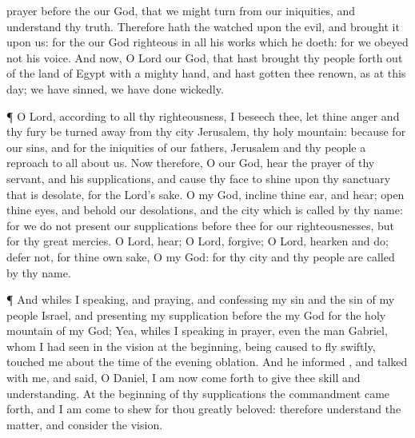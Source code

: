 {prayer
before the
{} our
God, that we might
turn from our
iniquities, and
understand thy
truth.
Therefore hath the
{}
watched upon the
evil, and
brought it upon us: for the
{} our
God
{}
righteous in all his
works which he
doeth: for we
obeyed not his
voice.
And now, O
Lord our
God, that hast
brought thy
people
forth out of the
land of
Egypt with a
mighty
hand, and hast
gotten thee
renown, as at this
day; we have
sinned, we have done
wickedly.
\par }{\PP {}¶ O
Lord, according to all thy
righteousness, I beseech thee, let thine
anger and thy
fury be turned
away from thy
city
Jerusalem, thy
holy
mountain: because for our
sins, and for the
iniquities of our
fathers,
Jerusalem and thy
people
{} a
reproach to all
{}
about us.
Now therefore, O our
God,
hear the
prayer of thy
servant, and his
supplications, and cause thy
face to
shine upon thy
sanctuary that is
desolate, for the
Lord’s sake.
O my
God,
incline thine
ear, and
hear;
open thine
eyes, and
behold our
desolations, and the
city which is
called by thy
name: for we do not
present our
supplications
before thee for our
righteousnesses, but for thy
great
mercies.
O
Lord,
hear; O
Lord,
forgive; O
Lord,
hearken and
do;
defer
not, for thine own sake, O my
God: for thy
city and thy
people are
called by thy
name.
\par }{\PP {}¶ And whiles I
{}
speaking, and
praying, and
confessing my
sin and the
sin of my
people
Israel, and
presenting my
supplication
before the
{} my
God for the
holy
mountain of my
God;
Yea, whiles I
{}
speaking in
prayer, even the
man
Gabriel, whom I had
seen in the
vision at the
beginning, being caused to
fly
swiftly,
touched me about the
time of the
evening
oblation.
And he
informed
{}, and
talked with me, and
said, O
Daniel, I am now come
forth to give thee
skill and
understanding.
At the
beginning of thy
supplications the
commandment came
forth, and I am
come to
shew
{} for thou
{} greatly
beloved: therefore
understand the
matter, and
consider the
vision.}
